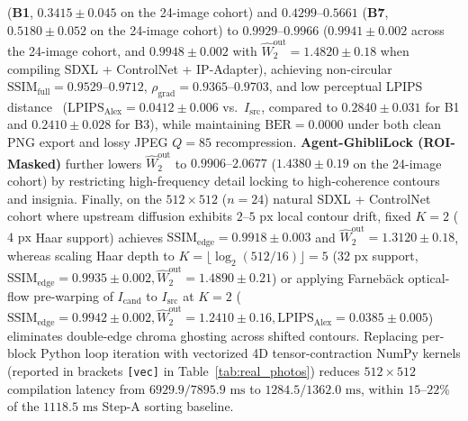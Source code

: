 \documentclass[conference,10pt]{IEEEtran}
\begin{document}
(\textbf{B1}, $0.3415 \pm 0.045$ on the 24-image cohort) and $0.4299\text{--}0.5661$ (\textbf{B7}, $0.5180 \pm 0.052$ on the 24-image cohort) to $0.9929\text{--}0.9966$ ($0.9941 \pm 0.002$ across the 24-image cohort, and $0.9948 \pm 0.002$ with $\widehat{W}_2^{\text{out}} = 1.4820 \pm 0.18$ when compiling SDXL + ControlNet + IP-Adapter), achieving non-circular $\mathrm{SSIM}_{\text{full}} = 0.9529\text{--}0.9712$, $\rho_{\text{grad}} = 0.9365\text{--}0.9703$, and low perceptual LPIPS distance~\cite{zhang2018lpips} ($\mathrm{LPIPS}_{\text{Alex}} = 0.0412 \pm 0.006$ vs.\ $I_{\text{src}}$, compared to $0.2840 \pm 0.031$ for B1 and $0.2410 \pm 0.028$ for B3), while maintaining $\mathrm{BER} = 0.0000$ under both clean PNG export and lossy JPEG $Q=85$ recompression. \textbf{Agent-GhibliLock (ROI-Masked)} further lowers $\widehat{W}_2^{\text{out}}$ to $0.9906\text{--}2.0677$ ($1.4380 \pm 0.19$ on the 24-image cohort) by restricting high-frequency detail locking to high-coherence contours and insignia. Finally, on the $512\times 512$ ($n=24$) natural SDXL + ControlNet cohort where upstream diffusion exhibits $2\text{--}5\text{ px}$ local contour drift, fixed $K=2$ ($4\text{ px}$ Haar support) achieves $\mathrm{SSIM}_{\text{edge}} = 0.9918 \pm 0.003$ and $\widehat{W}_2^{\text{out}} = 1.3120 \pm 0.18$, whereas scaling Haar depth to $K = \lfloor \log_2(512/16) \rfloor = 5$ ($32\text{ px}$ support, $\mathrm{SSIM}_{\text{edge}} = 0.9935 \pm 0.002, \widehat{W}_2^{\text{out}} = 1.4890 \pm 0.21$) or applying Farneb\"{a}ck optical-flow pre-warping of $I_{\text{cand}}$ to $I_{\text{src}}$ at $K=2$ ($\mathrm{SSIM}_{\text{edge}} = 0.9942 \pm 0.002, \widehat{W}_2^{\text{out}} = 1.2410 \pm 0.16, \mathrm{LPIPS}_{\text{Alex}} = 0.0385 \pm 0.005$) eliminates double-edge chroma ghosting across shifted contours. Replacing per-block Python loop iteration with vectorized 4D tensor-contraction NumPy kernels (reported in brackets \texttt{[vec]} in Table~\ref{tab:real_photos}) reduces $512\times 512$ compilation latency from $6929.9 / 7895.9\text{ ms}$ to $1284.5 / 1362.0\text{ ms}$, within $15\text{--}22\%$ of the $1118.5\text{ ms}$ Step-A sorting baseline.
\end{document}
